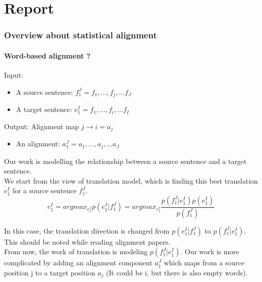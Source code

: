 \documentclass{article}
\begin{document}

\pagebreak 
\part{Report}

\section{Overview about statistical alignment }

\subsection{Word-based alignment ? \cite{Och2003Systematic}}
Input:
\begin{itemize}
\item A source sentence: $f_1^J = f_1,...,f_j,...f_J$
\item A target sentence: $e_1^I = f_1,...,f_i,...f_I$
\end{itemize}
Output: Alignment map $j \rightarrow i = a_j$
\begin{itemize}
\item An alignment: $a_1^J = a_1,...,a_j,...a_J$
\end{itemize}


Our work is modelling the relationship between a source sentence and a target sentence. \\
We start from the view of translation model, which is finding this best translation $e_1^I$ for a source sentence $f_1^J$.
\begin{equation}
e_1^I = argmax_{e_1^I} p(e_1^I|f_1^J) = argmax_{e_1^I} \frac{p(f_1^J|e_1^I)p(e_1^I)}{p(f_1^J)}
\end{equation}

In this case, the translation direction is changed from $p(e_1^I|f_1^J)$ to $p(f_1^J|e_1^I)$. This should be noted while reading alignment papers. \\

From now, the work of translation is modeling $p(f_1^J|e_1^I)$. Our work is more complicated by adding an alignment component $a_1^J$ which maps from a source position j to a target position $a_j$ (It could be i, but there is also empty words).
\end{document}
